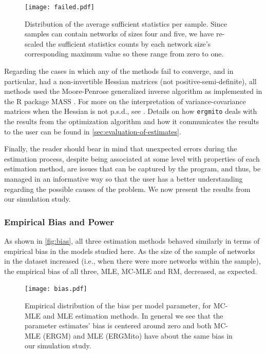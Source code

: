 \documentclass[review, nonatbib,doubleblind]{elsarticle/elsarticle}
\begin{document}
\begin{figure}[tb]
 	\centering
 	\caption{\label{fig:failed}Distribution of the average sufficient statistics per sample. Since samples can contain networks of sizes four and five, we have re-scaled the sufficient statistics counts by each network size's corresponding maximum value so these range from zero to one.}
 	\texttt{[image: failed.pdf]}
\end{figure}

Regarding the cases in which any of the methods fail to converge, and in particular, had a non-invertible Hessian matrices (not positive-semi-definite), all methods used the Moore-Penrose generalized inverse algorithm as implemented in the R package MASS \cite{Venables2002}. For more on the interpretation of variance-covariance matrices when the Hessian is not p.s.d., see \cite{Gill2004}. Details on how \texttt{ergmito} deals with the results from the optimization algorithm and how it communicates the results to the user can be found in \autoref{sec:evaluation-of-estimates}.

Finally, the reader should bear in mind that  unexpected errors during the estimation process, despite being associated at some level with properties of each estimation method, are issues that can be captured by the program, and thus, be managed in an informative way so that the user has a better understanding regarding the possible causes of the problem. We now present the results from our simulation study.

\subsubsection{Empirical Bias and Power}

As shown in \autoref{fig:bias}, all three estimation methods behaved similarly in terms of empirical bias in the models studied here. As the size of the sample of networks in the dataset increased (i.e., when there were more networks within the sample), the empirical bias of all three, MLE, MC-MLE and RM, decreased, as expected.

\begin{figure}[tb]
	\centering
	\caption{\label{fig:bias}Empirical distribution of the bias per model parameter, for MC-MLE and MLE estimation methods. In general we see that the parameter estimates' bias is centered around zero and both MC-MLE (ERGM) and MLE (ERGMito) have about the same bias in our simulation study.}
	\texttt{[image: bias.pdf]}
\end{figure}
\end{document}

